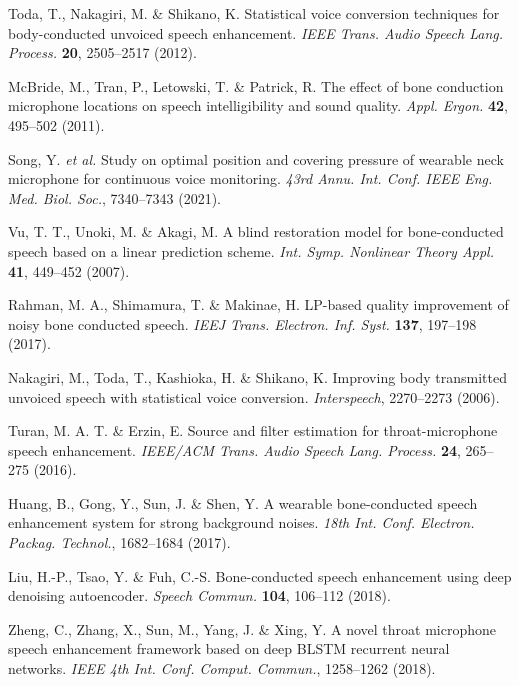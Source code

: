 \documentclass[10pt]{wlscirep}
\begin{document}
\begin{thebibliography}{99}

Toda, T., Nakagiri, M. \& Shikano, K. Statistical voice conversion techniques for body-conducted unvoiced speech enhancement.
\textit{IEEE Trans. Audio Speech Lang. Process.} \textbf{20}, 2505–2517 (2012).

McBride, M., Tran, P., Letowski, T. \& Patrick, R. The effect of bone conduction microphone locations on speech intelligibility and sound quality.
\textit{Appl. Ergon.} \textbf{42}, 495–502 (2011).

Song, Y. \textit{et al.} Study on optimal position and covering pressure of wearable neck microphone for continuous voice monitoring.
\textit{43rd Annu. Int. Conf. IEEE Eng. Med. Biol. Soc.}, 7340–7343 (2021).

Vu, T. T., Unoki, M. \& Akagi, M. A blind restoration model for bone-conducted speech based on a linear prediction scheme.
\textit{Int. Symp. Nonlinear Theory Appl.} \textbf{41}, 449–452 (2007).

Rahman, M. A., Shimamura, T. \& Makinae, H. LP-based quality improvement of noisy bone conducted speech.
\textit{IEEJ Trans. Electron. Inf. Syst.} \textbf{137}, 197–198 (2017).

Nakagiri, M., Toda, T., Kashioka, H. \& Shikano, K. Improving body transmitted unvoiced speech with statistical voice conversion.
\textit{Interspeech}, 2270–2273 (2006).

Turan, M. A. T. \& Erzin, E. Source and filter estimation for throat-microphone speech enhancement.
\textit{IEEE/ACM Trans. Audio Speech Lang. Process.} \textbf{24}, 265–275 (2016).

Huang, B., Gong, Y., Sun, J. \& Shen, Y. A wearable bone-conducted speech enhancement system for strong background noises.
\textit{18th Int. Conf. Electron. Packag. Technol.}, 1682–1684 (2017).

Liu, H.-P., Tsao, Y. \& Fuh, C.-S. Bone-conducted speech enhancement using deep denoising autoencoder.
\textit{Speech Commun.} \textbf{104}, 106–112 (2018).

Zheng, C., Zhang, X., Sun, M., Yang, J. \& Xing, Y. A novel throat microphone speech enhancement framework based on deep BLSTM recurrent neural networks.
\textit{IEEE 4th Int. Conf. Comput. Commun.}, 1258–1262 (2018).


\end{thebibliography}
\end{document}
